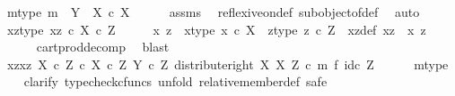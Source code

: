 \begin{isabellebody}
\ m{\isacharunderscore}{\kern0pt}type{\isacharcolon}{\kern0pt}\ {\isachardoublequoteopen}m\ {\isacharcolon}{\kern0pt}\ Y\ {\isasymrightarrow}\ X\ {\isasymtimes}\isactrlsub c\ X{\isachardoublequoteclose}\isanewline
\ \ \ \ \isamarkupfalse%
\ assms\ \isamarkupfalse%
\ reflexive{\isacharunderscore}{\kern0pt}on{\isacharunderscore}{\kern0pt}def\ subobject{\isacharunderscore}{\kern0pt}of{\isacharunderscore}{\kern0pt}def{}\ \isamarkupfalse%
\ auto\isanewline
\ \ \isamarkupfalse%
\ xz{\isacharunderscore}{\kern0pt}type{\isacharcolon}{\kern0pt}\ {\isachardoublequoteopen}xz\ {\isasymin}\isactrlsub c\ X\ {\isasymtimes}\isactrlsub c\ Z{\isachardoublequoteclose}\isanewline
\ \ \isamarkupfalse%
\ \isamarkupfalse%
\ x\ z\ \ x{\isacharunderscore}{\kern0pt}type{\isacharcolon}{\kern0pt}\ {\isachardoublequoteopen}x\ {\isasymin}\isactrlsub c\ X{\isachardoublequoteclose}\ \ z{\isacharunderscore}{\kern0pt}type{\isacharcolon}{\kern0pt}\ {\isachardoublequoteopen}z\ {\isasymin}\isactrlsub c\ Z{\isachardoublequoteclose}\ \ xz{\isacharunderscore}{\kern0pt}def{\isacharcolon}{\kern0pt}\ {\isachardoublequoteopen}xz\ {\isacharequal}{\kern0pt}\ {\isasymlangle}x{\isacharcomma}{\kern0pt}\ z{\isasymrangle}{\isachardoublequoteclose}\isanewline
\ \ \ \ \isamarkupfalse%
\ cart{\isacharunderscore}{\kern0pt}prod{\isacharunderscore}{\kern0pt}decomp\ \isamarkupfalse%
\ blast\isanewline
\ \ \isamarkupfalse%
\ \isamarkupfalse%
\ {\isachardoublequoteopen}{\isasymlangle}xz{\isacharcomma}{\kern0pt}xz{\isasymrangle}\ {\isasymin}\isactrlbsub {\isacharparenleft}{\kern0pt}X\ {\isasymtimes}\isactrlsub c\ Z{\isacharparenright}{\kern0pt}\ {\isasymtimes}\isactrlsub c\ X\ {\isasymtimes}\isactrlsub c\ Z\isactrlesub \ {\isacharparenleft}{\kern0pt}Y\ {\isasymtimes}\isactrlsub c\ Z{\isacharcomma}{\kern0pt}\ distribute{\isacharunderscore}{\kern0pt}right\ X\ X\ Z\ {\isasymcirc}\isactrlsub c\ m\ {\isasymtimes}\isactrlsub f\ id\isactrlsub c\ Z{\isacharparenright}{\kern0pt}{\isachardoublequoteclose}\isanewline
\ \ \ \ \isamarkupfalse%
\ m{\isacharunderscore}{\kern0pt}type\isanewline
\ \ \isamarkupfalse%
\ {\isacharparenleft}{\kern0pt}clarify{\isacharcomma}{\kern0pt}\ typecheck{\isacharunderscore}{\kern0pt}cfuncs{\isacharcomma}{\kern0pt}\ unfold\ relative{\isacharunderscore}{\kern0pt}member{\isacharunderscore}{\kern0pt}def{}{\isacharcomma}{\kern0pt}\ safe{\isacharparenright}{\kern0pt}\isanewline

\end{isabellebody}
